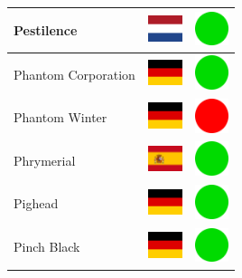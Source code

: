 \documentclass[12pt, a4paper, twoside]{report}
\begin{document}
\begin{center}
\begin{longtable}{|p{5cm}|p{2cm}|p{2cm}|}
 Pestilence                                                 & \includegraphics[width=1cm]{../4x3/nl} &   \includegraphics[width=1cm]{../likes/y} \\ \hline
 Phantom Corporation                                        & \includegraphics[width=1cm]{../4x3/de} &   \includegraphics[width=1cm]{../likes/y} \\ \hline
 Phantom Winter                                             & \includegraphics[width=1cm]{../4x3/de} &   \includegraphics[width=1cm]{../likes/n} \\ \hline
 Phrymerial                                                 & \includegraphics[width=1cm]{../4x3/es} &   \includegraphics[width=1cm]{../likes/y} \\ \hline
 Pighead                                                    & \includegraphics[width=1cm]{../4x3/de} &   \includegraphics[width=1cm]{../likes/y} \\ \hline
 Pinch Black                                                & \includegraphics[width=1cm]{../4x3/de} &   \includegraphics[width=1cm]{../likes/y} \\ \hline

\end{longtable}
\end{center}
\end{document}
